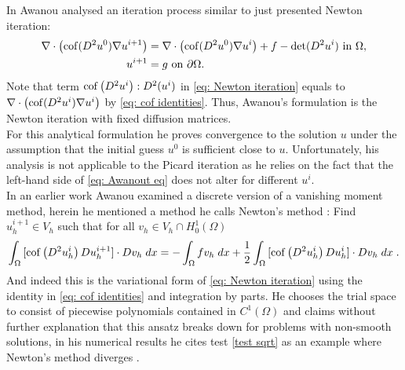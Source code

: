 In \cite{Awanou2014} Awanou analysed an iteration process similar to just presented Newton iteration:
\begin{align}
	\nabla \cdot \left( \operatorname{cof}(D^2 u^0) \nabla u^{i+1} \right) &= \nabla \cdot \left( \operatorname{cof}(D^2 u^0) \nabla u^{i} \right) + f - \operatorname{det} (D^2u^i) \textnormal{ in } \Omega,  \label{eq: Awanout eq}\\
	u^{i+1} &= g \textnormal{ on } \partial \Omega.
\end{align}
Note that term $\operatorname{cof} \left( D^2 u^i \right):D^2(u^i)$ in \eqref{eq: Newton iteration} equals to $\nabla \cdot \left( \operatorname{cof}(D^2 u^i) \nabla u^{i} \right)$ by \eqref{eq: cof identities}. Thus, Awanou's formulation is the Newton iteration with fixed diffusion matrices.\\
For this analytical formulation he proves convergence to the \MA solution $u$ under the assumption that the initial guess $u^0$ is sufficient close to $u$. Unfortunately, his analysis is not applicable to the Picard iteration as he relies on the fact that the left-hand side of \eqref{eq: Awanout eq} does not alter for different $u^i$.\\
In an earlier work \cite{Awanou2010} Awanou examined a discrete version of a vanishing moment method, herein he mentioned a method he calls Newton's method \cite[(1.3)]{Awanou2010}: Find $u_h^{i+1}\in V_h$ such that for all $v_h \in V_h \cap H^1_0 (\Omega)$
\[
	\int_{\Omega} {{[\operatorname{cof} \left(  D^2 u_h^i \right) Du_h^{i+1}] \cdot Dv_h}\;dx} 
	= -	\int_{\Omega} {{f v_h}\;dx} 
		+ \frac 1 2 \int_{\Omega} {{[\operatorname{cof} \left(  D^2 u_h^i \right) Du_h^{i}] \cdot Dv_h}\;dx} \;  \label{eq: Awanout eq2}.
\]
And indeed this is the variational form of \eqref{eq: Newton iteration} using the identity in \eqref{eq: cof identities} and integration by parts.
He chooses the trial space to consist of piecewise polynomials contained in $C^1(\Omega)$ and claims without further explanation that this ansatz breaks down for problems with non-smooth solutions\cite[Introduction]{Awanou2010}, in his numerical results he cites test \ref{test sqrt} as an example where Newton's method diverges \cite[Section 4.4]{Awanou2010}.

